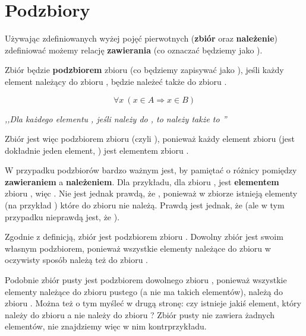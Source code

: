 \section{Podzbiory}
Używając zdefiniowanych wyżej pojęć pierwotnych (\textbf{zbiór} oraz \textbf{należenie}) zdefiniować możemy relację \textbf{zawierania} (co oznaczać będziemy jako \m{\subseteq}). 

\begin{definition}[Podzbiór]
Zbiór  będzie \textbf{podzbiorem} zbioru  (co będziemy zapisywać jako ), jeśli każdy element należący do zbioru , będzie należeć także do zbioru .

\[
\forall{x}\ (x \in A \Rightarrow x \in B)
\]
\begin{center}
    \textit{,,Dla każdego elementu , jeśli  należy do , to  należy także to ''}
\end{center}
\end{definition}

Zbiór  jest więc podzbiorem zbioru  (czyli ), ponieważ każdy element zbioru  (jest dokładnie jeden element, ) jest elementem zbioru . 

W przypadku podzbiorów bardzo ważnym jest, by pamiętać o różnicy pomiędzy \textbf{zawieraniem} a \textbf{należeniem}. Dla przykładu, dla zbioru ,  jest \textbf{elementem} zbioru , więc . Nie jest jednak prawdą, że , ponieważ w zbiorze  istnieją elementy (na przykład ) które do zbioru  nie należą. Prawdą jest jednak, że  (ale w tym przypadku nieprawdą jest, że ).

Zgodnie z definicją, zbiór  jest podzbiorem zbioru . Dowolny zbiór  jest swoim własnym podzbiorem, ponieważ wszystkie elementy należące do zbioru  w oczywisty sposób należą też do zbioru .

Podobnie zbiór pusty \m{\emptyset} jest podzbiorem dowolnego zbioru , ponieważ wszystkie elementy należące do zbioru pustego (a nie ma takich elementów), należą do zbioru . Można też o tym myśleć w drugą stronę: czy istnieje jakiś element, który należy do zbioru \m{\emptyset} a nie należy do zbioru ? Zbiór pusty nie zawiera żadnych elementów, nie znajdziemy więc w nim kontrprzykładu.

